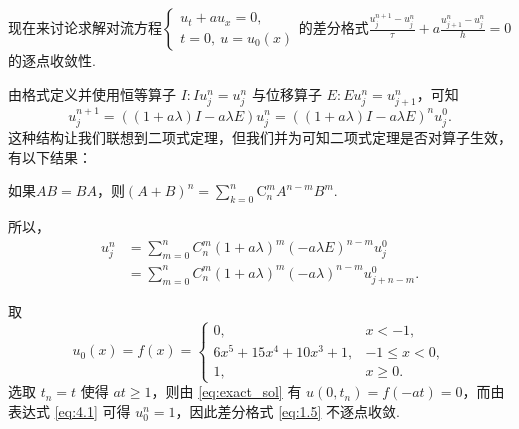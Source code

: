 \begin{instance}[对流方程向前差分格式的逐点收敛性]
    现在来讨论求解对流方程$\begin{cases} 
    u_t + a u_x = 0, \\ 
    t = 0, \ u = u_0(x)
    \end{cases}$的差分格式$\frac{u_j^{n+1} - u_j^n}{\tau} + a \frac{u_{j+1}^n - u_j^n}{h} = 0$的逐点收敛性. \par
\noindent{} 由格式定义并使用恒等算子 $I: I u_j^n = u_j^n$ 与位移算子 $E: E u_j^n = u_{j+1}^n$，可知
\[ u_j^{n+1} = ((1 + a\lambda)I - a\lambda E)u_j^n = \left((1 + a\lambda)I - a\lambda E\right)^n u_j^0. \]
这种结构让我们联想到二项式定理，但我们并为可知二项式定理是否对算子生效，有以下结果：
\begin{theorem}[算子的二项式定理]
    如果$AB=BA$，则$(A+B)^n=\sum_{k=0}^n\mathrm{C}_n^m A^{n-m}B^m.$
\end{theorem}
所以，
\begin{equation}
    \begin{aligned}
        u_j^n &= \sum_{m=0}^n C_n^m (1 + a\lambda)^m (-a\lambda E)^{n-m} u_j^0 \\
        &= \sum_{m=0}^n C_n^m (1 + a\lambda)^m (-a\lambda)^{n-m} u_{j+n-m}^0.
    \end{aligned} \label{eq:4.1}
\end{equation}

\noindent{} 取
\[ u_0(x) = f(x) = \begin{cases}
    0, & x < -1, \\
    6x^5 + 15x^4 + 10x^3 + 1, & -1 \leq x < 0, \\
    1, & x \geq 0.
\end{cases} \]
选取 $t_n = t$ 使得 $at \geq 1$，则由 \eqref{eq:exact_sol} 有 $u(0, t_n) = f(-at) = 0$，而由表达式 \eqref{eq:4.1} 可得 $u_0^n = 1$，因此差分格式 \eqref{eq:1.5} 不逐点收敛.
\end{instance}
